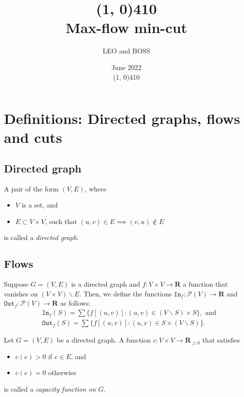 \documentclass{article}
\title{\line(1, 0){410}\\Max-flow min-cut}
\author{LEO and BOSS}
\date{June 2022\\\line(1, 0){410}}
\begin{document}
\maketitle
\large

\tableofcontents

\section{Definitions: Directed graphs, flows and cuts}
\subsection{Directed graph}
\begin{definition}
    A pair of the form $(V, E)$, where
    \begin{itemize}
        \item $V$ is a set, and
        \item $E \subset V \times V$, such that $(u, v) \in E \implies (v, u) \not\in E$
    \end{itemize}
    is called a \textit{directed graph}.
\end{definition}

\subsection{Flows}
\begin{definition}
    Suppose $G=(V, E)$ is a directed graph and $f: V \times V \to \mathbf{R}$ a function that vanishes on $(V \times V) \backslash E$. Then, we define the functions $\texttt{In}_f: \mathcal{P}(V) \to \mathbf{R}$ and $\texttt{Out}_f: \mathcal{P}(V) \to \mathbf{R}$ as follows:
    \begin{align*}
        &\texttt{In}_f(S) = \sum \{f[(u, v)]: (u, v) \in (V \backslash S) \times S\}, \text{ and}\\
        &\texttt{Out}_f(S) = \sum \{f[(u, v)]: (u, v) \in S \times (V \backslash S)\}.
    \end{align*}
\end{definition}

\begin{definition}
    Let $G=(V, E)$ be a directed graph. A function $c: V \times V \to \mathbf{R}_{\geq 0}$ that satisfies
    \begin{itemize}
        \item $c(e) > 0$ if $e \in E$, and
        \item $c(e) = 0$ otherwise
    \end{itemize}
    is called a \textit{capacity function on $G$}.
\end{definition}
\end{document}
